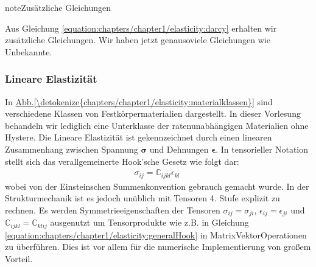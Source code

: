 \documentclass[letterpaper,10pt,german]{jupyterBook}
\begin{document}
\begin{sphinxadmonition}{note}{Zusätzliche Gleichungen}

\sphinxAtStartPar
Aus Gleichung \eqref{equation:chapters/chapter1/elasticity:darcy} erhalten wir  zusätzliche Gleichungen. Wir haben jetzt genausoviele Gleichungen wie Unbekannte.
\end{sphinxadmonition}


\subsubsection{Lineare Elastizität}
\label{\detokenize{chapters/chapter1/elasticity:lineare-elastizitat}}
\sphinxAtStartPar
In \hyperref[\detokenize{chapters/chapter1/elasticity:materialklassen}]{Abb.\@ \ref{\detokenize{chapters/chapter1/elasticity:materialklassen}}} sind verschiedene Klassen von Festkörpermaterialien dargestellt. In dieser Vorlesung behandeln wir lediglich eine Unterklasse der ratenunabhängigen Materialien ohne Hystere. Die Lineare Elastizität ist gekennzeichnet durch einen linearen Zusammenhang zwischen Spannung \(\bm{\sigma}\) und Dehnungen \(\bm{\epsilon}\). In tensorieller Notation stellt sich das verallgemeinerte Hook’sche Gesetz wie folgt dar:
\begin{equation}\label{equation:chapters/chapter1/elasticity:generalHook}
\begin{split}\sigma_{ij} = \mathbb{C}_{ijkl} \epsilon_{kl} \;\end{split}
\end{equation}
\sphinxAtStartPar
wobei von der Einsteinschen Summenkonvention gebrauch gemacht wurde. In der Strukturmechanik ist es jedoch unüblich mit Tensoren 4. Stufe explizit zu rechnen. Es werden Symmetrieeigenschaften der Tensoren \(\sigma_{ij}=\sigma_{ji}\), \(\epsilon_{ij}=\epsilon_{ji}\) und \(\mathbb{C}_{ijkl}=\mathbb{C}_{klij}\) ausgenutzt um Tensorprodukte wie z.B. in Gleichung \eqref{equation:chapters/chapter1/elasticity:generalHook} in Matrix\sphinxhyphen{}Vektor\sphinxhyphen{}Operationen zu überführen. Dies ist vor allem für die numerische Implementierung von großem Vorteil.
\end{document}
